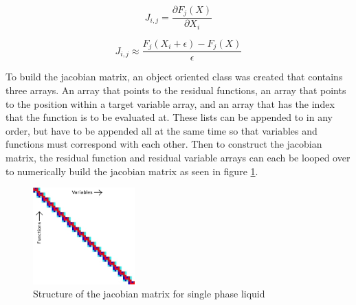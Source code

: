    \begin{equation}
    	\label{eq:jac_def}
    	J_{i,j}=\frac{ \partial F_{j}(X)}{\partial X_{i}}
    \end{equation}
    
    \begin{equation}
    	\label{eq:jac_numerical}
    	J_{i,j}  \approx \frac{F_{j}(X_{i}+\epsilon)-F_{j}(X)}{\epsilon}
    \end{equation}
    
    To build the jacobian matrix, an object oriented class was created that
    contains three arrays. An array that points to the residual functions, an
    array that points to the position within a target variable array, and an
    array that has the index that the function is to be evaluated at. These
    lists can be appended to in any order, but have to be appended all at the
    same time so that variables and functions must correspond with each other.
    Then to construct the jacobian matrix, the residual function and residual
    variable arrays can each be looped over to numerically build the jacobian
    matrix as seen in figure \ref{fig:Jacobian_Setup}. 
    
    \begin{figure}[!h]
    	\centering
    	\includegraphics[width=0.35\textwidth]{images/Jacobian_Setup}
    	\caption{Structure of the jacobian matrix for single phase liquid}
    	\label{fig:Jacobian_Setup}
    \end{figure}


